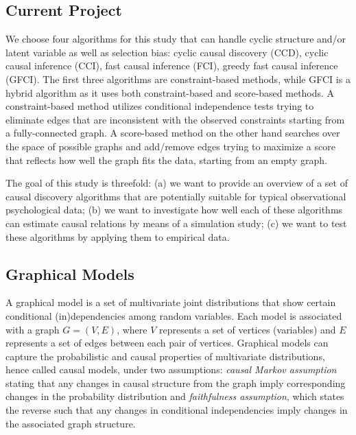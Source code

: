 \documentclass[11pt]{article}
\theoremstyle{definition}
\begin{document}
\subsection{Current Project}
We choose four algorithms for this study that can handle cyclic structure and/or latent variable as well as selection bias: cyclic causal discovery (CCD), cyclic causal inference (CCI), fast causal inference (FCI), greedy fast causal inference (GFCI). The first three algorithms are constraint-based methods, while GFCI is a hybrid algorithm as it uses both constraint-based and score-based methods. A constraint-based method utilizes conditional independence tests trying to eliminate edges that are inconsistent with the observed constraints starting from a fully-connected graph. A score-based method on the other hand searches over the space of possible graphs and add/remove edges trying to maximize a score that reflects how well the graph fits the data, starting from an empty graph. 


The goal of this study is threefold: (a) we want to provide an overview of a set of causal discovery algorithms that are potentially suitable for typical observational psychological data; (b) we want to investigate how well each of these algorithms can estimate causal relations by means of a simulation study; (c) we want to test these algorithms by applying them to empirical data.

\subsection{Graphical Models}
A graphical model is a set of multivariate joint distributions that show certain conditional (in)dependencies among random variables. Each model is associated with a graph $G = (V, E)$, where $V$ represents a set of vertices (variables) and $E$ represents a set of edges between each pair of vertices. Graphical models can capture the probabilistic and causal properties of multivariate distributions, hence called causal models, under two assumptions: \textit{causal Markov assumption} stating that any changes in causal structure from the graph imply corresponding changes in the probability distribution and \textit{faithfulness assumption}, which states the reverse such that any changes in conditional independencies imply changes in the associated graph structure.
\end{document}

